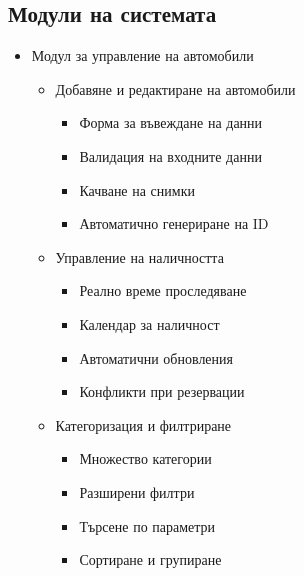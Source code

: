 \documentclass[12pt,a4paper]{article}
\begin{document}
\subsection{Модули на системата}
\begin{itemize}
    \item Модул за управление на автомобили
    \begin{itemize}
        \item Добавяне и редактиране на автомобили
        \begin{itemize}
            \item Форма за въвеждане на данни
            \item Валидация на входните данни
            \item Качване на снимки
            \item Автоматично генериране на ID
        \end{itemize}
        \item Управление на наличността
        \begin{itemize}
            \item Реално време проследяване
            \item Календар за наличност
            \item Автоматични обновления
            \item Конфликти при резервации
        \end{itemize}
        \item Категоризация и филтриране
        \begin{itemize}
            \item Множество категории
            \item Разширени филтри
            \item Търсене по параметри
            \item Сортиране и групиране
        \end{itemize}
    \end{itemize}
    

\end{itemize}
\end{document}
